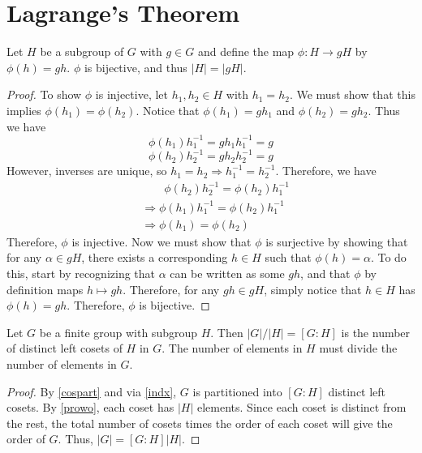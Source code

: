 \documentclass[12pt, letterpaper]{report}
\begin{document}
\section{Lagrange's Theorem}
\begin{proposition}\label{prowo}
	Let \(H\) be a subgroup of \(G\) with \(g\in G\) and define the map \(\phi :H\to gH\) by \(\phi (h)=gh\). \(\phi \) is bijective, and thus \(\vert H \vert=\vert gH \vert  \).
\end{proposition}
\begin{proof}
	To show \(\phi \) is injective, let \(h_1,h_2\in H\) with \(h_1 =h_2\). We must show that this implies \(\phi (h_1)=\phi (h_2)\). Notice that \(\phi (h_1)=gh_1\) and \(\phi (h_2)=gh_2\). Thus we have
	\[
		\phi (h_1)h^{-1}_1 =gh_1 h_1 ^{-1} =g
	\]
	\[
		\phi (h_2)h^{-1} _2 = gh_2 h_2 ^{-1} =g
	\]
	However, inverses are unique, so \(h_1 = h_2 \Longrightarrow h_1 ^{-1} =h_2 ^{-1} \). Therefore, we have
	\begin{align*}
		&\qquad \phi (h_2)h_2 ^{-1} = \phi (h_2)h_1 ^{-1}\\
		&\Longrightarrow \phi (h_1)h_1 ^{-1} =\phi (h_2) h_1 ^{-1} \\
		&\Longrightarrow \phi (h_1)=\phi (h_2)
	\end{align*}
	Therefore, \(\phi \) is injective. Now we must show that \(\phi \) is surjective by showing that for any \(\alpha \in gH\), there exists a corresponding \(h\in H\) such that \(\phi (h)=\alpha \). To do this, start by recognizing that \(\alpha \) can be written as some \(gh\), and that \(\phi \) by definition maps \(h\mapsto gh\). Therefore, for any \(gh\in gH\), simply notice that \(h\in H\) has \(\phi (h)=gh\). Therefore, \(\phi \) is bijective.
\end{proof}
\begin{theorem}
	Let \(G\) be a finite group with subgroup \(H\). Then \(\vert G \vert /\vert H \vert = [G:H]  \) is the number of distinct left cosets of \(H\) in \(G\). The number of elements in \(H\) must divide the number of elements in \(G\).
\end{theorem}
\begin{proof}
	By \ref{cospart} and via \ref{indx}, \(G\) is partitioned into \([G:H]\) distinct left cosets. By \ref{prowo}, each coset has \(\vert H \vert \) elements. Since each coset is distinct from the rest, the total number of cosets times the order of each coset will give the order of \(G\). Thus, \(\vert G \vert=[G:H]\vert H \vert  \).
\end{proof}
\end{document}
